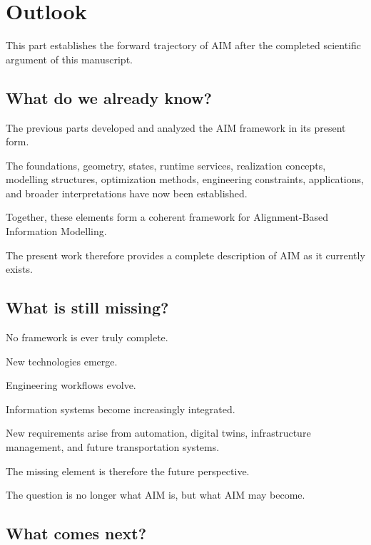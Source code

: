 
\chapter*{Outlook}
{}

This part establishes the forward trajectory of AIM after the completed
scientific argument of this manuscript.

\section*{What do we already know?}

The previous parts developed and analyzed the AIM framework in its
present form.

The foundations, geometry, states, runtime services, realization
concepts, modelling structures, optimization methods, engineering
constraints, applications, and broader interpretations have now been
established.

Together, these elements form a coherent framework for
Alignment-Based Information Modelling.

The present work therefore provides a complete description of AIM as it
currently exists.

\section*{What is still missing?}

No framework is ever truly complete.

New technologies emerge.

Engineering workflows evolve.

Information systems become increasingly integrated.

New requirements arise from automation, digital twins, infrastructure
management, and future transportation systems.

The missing element is therefore the future perspective.

The question is no longer what AIM is, but what AIM may become.

\section*{What comes next?}

